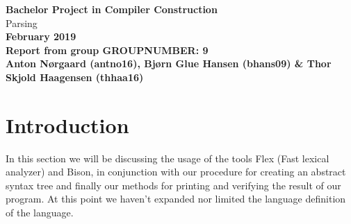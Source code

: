 \documentclass{article}
\newcommand{\bigfont}{\usefont{OT1}{cmbig}{m}{n}}
\newcommand{\MyHuge}[1]{{\bigfont\fontsize{2.2cm}{2.42cm}\selectfont #1}}
\begin{document}
\thispagestyle{empty}

\begin{center}
{\LARGE\bf Bachelor Project in Compiler Construction}
\\[15ex]
\MyHuge{Parsing}
\\[15ex]
{\LARGE\bf February 2019}
\\[10ex]
{\Large\bf Report from group GROUPNUMBER: 9 }
\\[2ex]
{\Large\bf Anton Nørgaard (antno16), Bjørn Glue Hansen (bhans09) \& Thor Skjold Haagensen (thhaa16)}
\end{center}

\setcounter{page}{0}

\newpage

\section{Introduction}
In this section we will be discussing the usage of the tools Flex (Fast lexical analyzer) and Bison,
in conjunction with our procedure for creating an abstract syntax tree and finally our methods for printing and verifying the result
of our program. At this point we haven't expanded nor limited the language definition of the language. 



\end{document}
